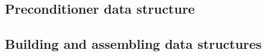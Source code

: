 \subsection{Preconditioner data structure}
\label{sec:prec}
\hypertarget{precdata}{}



\subsection{Building and assembling data structures}





